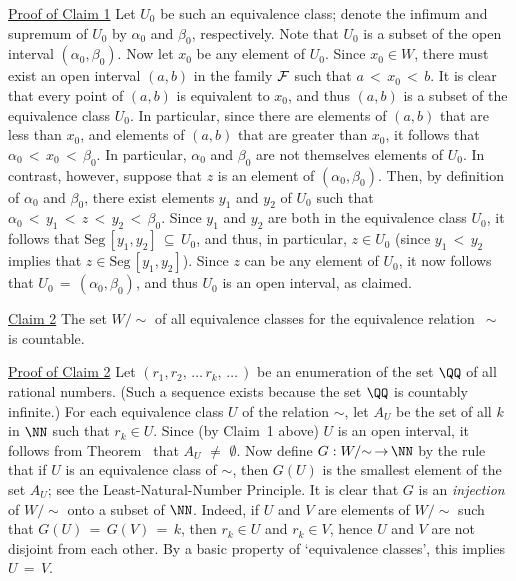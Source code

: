 {        \underline{Proof of Claim 1} Let $U_{0}$ be such an equivalence class;
    denote the infimum and supremum of $U_{0}$ by ${\alpha}_{0}$ and ${\beta}_{0}$, respectively.
    Note that $U_{0}$ is a subset of the open interval $({\alpha}_{0},{\beta}_{0})$.
    Now let $x_{0}$ be any element of $U_{0}$. Since $x_{0}{\in}W$, there must exist an open interval $(a,b)$ in the family ${\cal F}$ such that $a\,<\,x_{0}\,<\,b$.
    It is clear that every point of $(a,b)$ is equivalent to $x_{0}$, and thus $(a,b)$ is a subset of the equivalence class $U_{0}$.
    In particular, since there are elements of $(a,b)$ that are less than $x_{0}$, and elements of $(a,b)$ that are greater than $x_{0}$,
    it follows that ${\alpha}_{0}\,<\,x_{0}\,<\,{\beta}_{0}$.
    In particular, ${\alpha}_{0}$ and ${\beta}_{0}$ are not themselves elements of $U_{0}$.
    In contrast, however, suppose that $z$ is an element of $({\alpha}_{0},{\beta}_{0})$.
    Then, by definition of ${\alpha}_{0}$ and ${\beta}_{0}$, there exist elements $y_{1}$ and $y_{2}$ of $U_{0}$
    such that ${\alpha}_{0}\,<\,y_{1}\,<\,z\,<\,y_{2}\,<\,{\beta}_{0}$.
    Since $y_{1}$ and $y_{2}$ are both in the equivalence class $U_{0}$,
    it follows that $\mbox{Seg}\,[y_{1},y_{2}] \,{\subseteq}\, U_{0}$, and thus, in particular, $z{\in}U_{0}$
    (since $y_{1}\,<\,y_{2}$ implies that $z{\in}\mbox{Seg}\,[y_{1},y_{2}]$). Since $z$ can be any element of $U_{0}$, it now follows that $U_{0} \,=\, ({\alpha}_{0},{\beta}_{0})$, and thus $U_{0}$ is an open interval, as claimed.

\V

        \underline{Claim 2} The set $W/{\sim}$ of all equivalence classes for the equivalence relation $\,{\sim}\,$ is countable.

        \underline{Proof of Claim 2} Let $(r_{1},r_{2},\,{\ldots}\,r_{k},\,{\ldots}\,)$ be an enumeration of the set ${\QQ}$ of all rational numbers.
    (Such a sequence exists because the set ${\QQ}$ is countably infinite.)
 For each equivalence class $U$ of the relation ${\sim}$, let $A_{U}$ be the set of all $k$ in ${\NN}$ such that $r_{k}{\in}U$.
    Since (by Claim~1 above) $U$ is an open interval, it follows from Theorem~ that $A_{U} \,\,{\neq}\,\, {\emptyset}$.
    Now define $G:W/{\sim} \,{\rightarrow}\, {\NN}$ by the rule that if $U$ is an equivalence class of ${\sim}$,
    then $G(U)$ is the smallest element of the set $A_{U}$; see the Least-Natural-Number Principle.
    It is clear that $G$ is an {\em injection} of $W/{\sim}$ onto a subset of ${\NN}$.
    Indeed, if $U$ and $V$ are elements of $W/{\sim}$ such that $G(U) \,=\, G(V) \,=\, k$, then $r_{k}{\in}U$ and $r_{k}{\in}V$, hence $U$ and $V$ are not disjoint from each other.
    By a basic property of `equivalence classes', this implies $U \,=\, V$.

}
